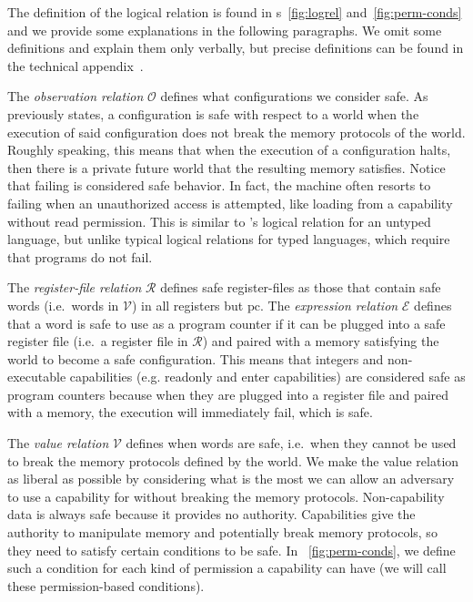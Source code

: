 \documentclass[acmsmall,review]{acmart}\settopmatter{printfolios=true}
\newcommand{\pcreg}{\mathrm{pc}}
\newcommand{\asmType}{\plaindom{AsmType}}
\newcommand{\plaindom}[1]{\mathrm{#1}}
\newcommand{\intr}[2]{\mathcal{#1}}
\newcommand{\valueintr}[1]{\intr{V}{#1}}
\newcommand{\exprintr}[1]{\intr{E}{#1}}
\newcommand{\regintr}[1]{\intr{R}{#1}}
\newcommand{\stdvr}{\valueintr{\asmType}}
\newcommand{\stder}{\exprintr{\asmType}}
\newcommand{\stdrr}{\regintr{\asmType}}
\newcommand{\observations}{\mathcal{O}}
\begin{document}
The definition of the logical relation is found in
\figurename{}s~\ref{fig:logrel} and~\ref{fig:perm-conds} and we provide some
explanations in the following paragraphs. We omit some definitions and explain
them only verbally, but precise definitions can be found in the technical
appendix~\citep{technical_appendix}.

The \emph{observation relation} $\observations$ defines what configurations we
consider safe. As previously states, a configuration is safe with respect to a
world when the execution of said configuration does not break the memory
protocols of the world. Roughly speaking, this means that when the execution of
a configuration halts, then there is a private future world that the resulting
memory satisfies.  Notice that failing is considered safe behavior. In fact, the
machine often resorts to failing when an unauthorized access is attempted, like
loading from a capability without read permission. This is similar to
\citet{Devriese:2016ObjCap}'s logical relation for an untyped language, but
unlike typical logical relations for typed languages, which require that
programs do not fail.

The \emph{register-file relation} $\stdrr$ defines safe register-files as those
that contain safe words (i.e.\ words in $\stdvr$) in all registers but $\pcreg$.
The \emph{expression relation} $\stder$ defines that a word is safe to use as a
program counter if it can be plugged into a safe register file (i.e.\ a register
file in $\stdrr$) and paired with a memory satisfying the world to become a
safe configuration. This means that integers and non-executable capabilities
(e.g. readonly and enter capabilities) are considered safe as program counters
because when they are plugged into a register file and paired with a memory, the
execution will immediately fail, which is safe.

The \emph{value relation} $\stdvr$ defines when words are safe, i.e.\ when they
cannot be used to break the memory protocols defined by the world. We make the
value relation as liberal as possible by considering what is the most we can
allow an adversary to use a capability for without breaking the memory
protocols. Non-capability data is always safe because it provides no
authority. Capabilities give the authority to manipulate memory and potentially
break memory protocols, so they need to satisfy certain conditions to be
safe. In \figurename~\ref{fig:perm-conds}, we define such a condition for each
kind of permission a capability can have (we will call these permission-based
conditions).
\end{document}
